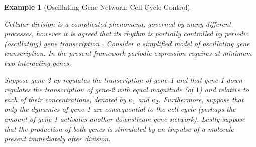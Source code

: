 \documentclass{article}
\newcommand{\1}{\mathbbm{1}}
\newtheorem{example}{Example}
\begin{document}
  \begin{example}[Oscillating Gene Network: Cell Cycle Control]\label{ex:oscillator}


    Cellular division is a complicated phenomena, governed by many different processes, however it is agreed that its rhythm is partially controlled by periodic (oscillating) gene transcription \citep{orlando2008global}. Consider a simplified model of oscillating gene transcription. In the present framework periodic expression requires at minimum two interacting genes. 

    Suppose gene-2 up-regulates the transcription of gene-1 and that gene-1 down-regulates the transcription of gene-2 with equal magnitude (of $1$) and relative to each of their concentrations, denoted by $\kappa_{1}$ and $\kappa_{2}$. Furthermore, suppose that only the dynamics of gene-1 are consequential to the cell cycle (perhaps the amount of gene-1 activates another downstream gene network). Lastly suppose that the production of both genes is stimulated by an impulse of a molecule present immediately after division.


\end{example}
\end{document}
